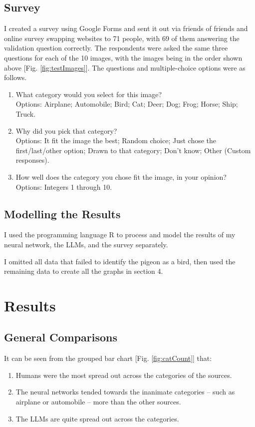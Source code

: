 \documentclass{article}
\begin{document}
\subsection{Survey}
I created a survey using Google Forms and sent it out via friends of friends and online survey swapping websites to 71 people, with 69 of them answering the validation question correctly. The respondents were asked the same three questions for each of the 10 images, with the images being in the order shown above [Fig. \ref{fig:testImages}]. The questions and multiple-choice options were as follows.
\begin{enumerate}
    \item What category would you select for this image? \\ Options: Airplane; Automobile; Bird; Cat; Deer; Dog; Frog; Horse; Ship; Truck.
    \item Why did you pick that category? \\ Options: It fit the image the best; Random choice; Just chose the first/last/other option; Drawn to that category; Don't know; Other (Custom responses).
    \item How well does the category you chose fit the image, in your opinion? \\ Options: Integers 1 through 10.
\end{enumerate}

\subsection{Modelling the Results}
I used the programming language R to process and model the results of my neural network, the LLMs, and the survey separately.

I omitted all data that failed to identify the pigeon as a bird, then used the remaining data to create all the graphs in section 4.



\section{Results}
\subsection{General Comparisons}

It can be seen from the grouped bar chart [Fig. \ref{fig:catCount}] that:
\begin{enumerate}
    \item Humans were the most spread out across the categories of the sources.
    \item The neural networks tended towards the inanimate categories -- such as airplane or automobile -- more than the other sources.
    \item The LLMs are quite spread out across the categories.
\end{enumerate}
\end{document}
